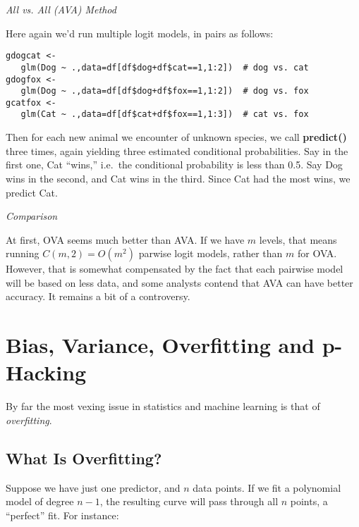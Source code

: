 \textit{All vs. All (AVA) Method}

Here again we'd run multiple logit models, in pairs as follows:

\begin{lstlisting}
gdogcat <- 
   glm(Dog ~ .,data=df[df$dog+df$cat==1,1:2])  # dog vs. cat
gdogfox <- 
   glm(Dog ~ .,data=df[df$dog+df$fox==1,1:2])  # dog vs. fox
gcatfox <- 
   glm(Cat ~ .,data=df[df$cat+df$fox==1,1:3])  # cat vs. fox
\end{lstlisting}

Then for each new animal we encounter of unknown species, we call
\textbf{predict()} three times, again yielding three estimated
conditional probabilities.  Say in the first one, Cat ``wins,'' i.e.\
the conditional probability is less than 0.5.  Say Dog wins in the
second, and Cat wins in the third.  Since Cat had the most wins, we
predict Cat.

\textit{Comparison}

At first, OVA seems much better than AVA.  If we have $m$ levels, that
means running $C(m,2) = O(m^2)$ parwise logit models, rather than $m$
for OVA.  However, that is somewhat compensated by the fact that each
pairwise model will be based on less data, and some analysts contend
that AVA can have better accuracy.  It remains a bit of a controversy.

\section{Bias, Variance, Overfitting and p-Hacking}
\label{overfit}

By far the most vexing issue in statistics and machine learning is that
of \textit{overfitting}.  

\subsection{What Is Overfitting?}
\label{norelation}

Suppose we have just one predictor, and $n$ data points.  If we fit a
polynomial model of degree $n-1$, the resulting curve will pass through
all $n$ points, a ``perfect'' fit.  For instance:

